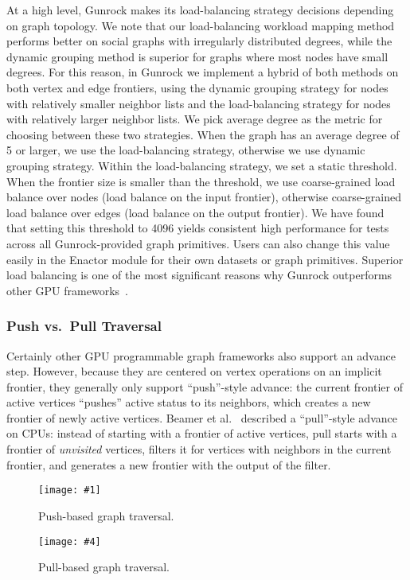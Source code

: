 \documentclass[format=acmsmall,review=false,screen=true]{acmart}
\newcommand\TwoFig[6]{%
  \sbox\IBoxA{\texttt{[image: \#1]}}
  \sbox\IBoxB{\texttt{[image: \#4]}}%
  \ifdim\ht\IBoxA>\ht\IBoxB
    \setlength\IHeight{\ht\IBoxB}\else\setlength\IHeight{\ht\IBoxA}\fi%
  \begin{figure}[!htb]
  \minipage[t]{0.49\textwidth}\centering
  \texttt{[image: \#1]}
  \caption{#2}\label{#3}
  \endminipage\hfill
  \minipage[t]{0.49\textwidth}\centering
  \texttt{[image: \#4]}
  \caption{#5}\label{#6}
  \endminipage
  \end{figure}%
}
\begin{document}
At a high level, Gunrock makes its load-balancing strategy decisions
depending on graph topology. We note that our load-balancing workload
mapping method performs better on social graphs with irregularly
distributed degrees, while the dynamic grouping method is superior for
graphs where most nodes have small degrees. For this reason, in
Gunrock we implement a hybrid of both methods on both vertex and edge
frontiers, using the dynamic grouping strategy for nodes with
relatively smaller neighbor lists and the load-balancing strategy for
nodes with relatively larger neighbor lists. We pick average degree as
the metric for choosing between these two strategies. When the graph
has an average degree of 5 or larger, we use the load-balancing
strategy, otherwise we use dynamic grouping strategy. Within the
load-balancing strategy, we set a static threshold. When the frontier
size is smaller than the threshold, we use coarse-grained load balance
over nodes (load balance on the input frontier), otherwise
coarse-grained load balance over edges (load balance on the output
frontier). We have found that setting this threshold to 4096 yields
consistent high performance for tests across all Gunrock-provided
graph primitives. Users can also change this value easily in the
Enactor module for their own datasets or graph primitives. Superior
load balancing is one of the most significant reasons why Gunrock
outperforms other GPU frameworks~\cite{Wu:2015:PCF}.

\subsubsection{Push vs.\ Pull Traversal}
\label{subsec:pull}
Certainly other GPU programmable graph frameworks also support an
advance step. However, because they are centered on vertex operations
on an implicit frontier, they generally only support ``push''-style
advance: the current frontier of active vertices ``pushes'' active
status to its neighbors, which creates a new frontier of newly active
vertices. Beamer et al.~ described a
``pull''-style advance on CPUs: instead of starting with a frontier of
active vertices, pull starts with a frontier of \emph{unvisited}
vertices, filters it for vertices with neighbors in the current
frontier, and generates a new frontier with the output of the filter.

\TwoFig{push.pdf}
{Push-based graph traversal.}
{fig:push}
{pull.pdf}
{Pull-based graph traversal.}
{fig:pull}
\end{document}
